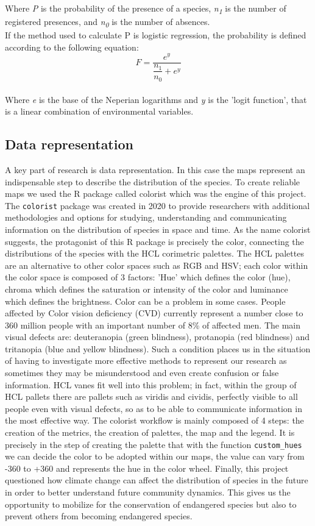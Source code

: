 \documentclass[12pt,a4paper]{article}
\begin{document}
Where \textit{P} is the probability of the presence of a species, \textit{n\textsubscript{1}} is the number of registered presences, and \textit{n\textsubscript{0}} is the number of absences.\\
If the method used to calculate P is logistic regression, the probability is defined according to the following equation:
\\ \[    F=\dfrac{e^y}{\dfrac{n_1}{n_0}+{e^y}}          \] \\

Where \textit{e} is the base of the Neperian logarithms and \textit{y} is the 'logit function', that is a linear combination of environmental variables.
\subsection{Data representation}
A key part of research is data representation. In this case the maps represent an indispensable step to describe the distribution of the species.
To create reliable maps we used the R package called colorist which was the engine of this project.
The \texttt{colorist} package was created in 2020 \citep{Schuetz} to provide researchers with additional methodologies and options for studying, understanding and communicating information on the distribution of species in space and time.
As the name colorist suggests, the protagonist of this R package is precisely the color, connecting the distributions of the species with the HCL corimetric palettes.
The HCL palettes are an alternative to other color spaces such as RGB and HSV; each color within the color space is composed of 3 factors: 'Hue' which defines the color (hue), chroma which defines the saturation or intensity of the color and luminance which defines the brightness.
Color can be a problem in some cases. People affected by Color vision deficiency (CVD) currently represent a number close to 360 million people with an important number of 8\% of affected men. The main visual defects are: deuteranopia (green blindness), protanopia (red blindness) and tritanopia (blue and yellow blindness).
Such a condition places us in the situation of having to investigate more effective methods to represent our research as sometimes they may be misunderstood and even create confusion or false information.
HCL vanes fit well into this problem; in fact, within the group of HCL pallets there are pallets such as viridis and cividis, perfectly visible to all people even with visual defects, so as to be able to communicate information in the most effective way.
The colorist workflow is mainly composed of 4 steps: the creation of the metrics, the creation of palettes, the map and the legend.
It is precisely in the step of creating the palette that with the function \texttt{custom\_hues} we can decide the color to be adopted within our maps, the value can vary from -360 to +360 and represents the hue in the color wheel.
Finally, this project questioned how climate change can affect the distribution of species in the future in order to better understand future community dynamics. This gives us the opportunity to mobilize for the conservation of endangered species but also to prevent others from becoming endangered species.
\end{document}

